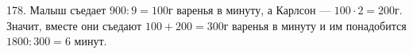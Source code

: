 178. Малыш съедает $900:9=100$г варенья в минуту, а Карлсон --- $100\cdot2=200$г. Значит, вместе они съедают $100+200=300$г варенья в минуту и им понадобится $1800:300=6$ минут.\\

